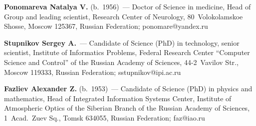 \noindent
       \textbf{Ponomareva Natalya V.} (b.\ 1956)~--- Doctor of Science in medicine, Head of 
Group and leading scientist, Research Center of Neurology, 80~Volokolamskoe Shosse, 
Moscow 125367, Russian Federation; ponomare@yandex.ru
       
\vspace*{3pt}

\noindent
       \textbf{Stupnikov Sergey A.}~--- Candidate of Science (PhD) in technology, senior 
scientist, Institute of Informatics Problems, Federal Research Center ``Computer Science and 
Control'' of the Russian Academy of Sciences, 44-2~Vavilov Str., Moscow 119333, Russian 
Federation; sstupnikov@ipi.ac.ru
       
\vspace*{3pt}

\noindent
       \textbf{Fazliev Alexander Z.} (b.\ 1953)~--- Candidate of Science (PhD) in physics and 
mathematics, Head of Integrated Information Systems Center, Institute of Atmospheric Optics of 
the Siberian Branch of the Russian Academy of Sciences, 1~Acad.\ Zuev Sq., Tomsk
634055, Russian Federation; faz@iao.ru

  
\label{end\stat}


\renewcommand{\bibname}{\protect\rm Литература}
 

 

 